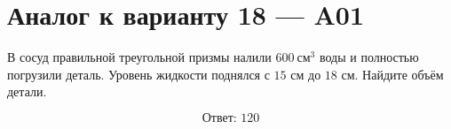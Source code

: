 \documentclass[12pt,a4paper]{article}
\begin{document}
\section*{Аналог к варианту 18 — A01}

В сосуд правильной треугольной призмы налили \(600\ \text{см}^3\) воды и полностью погрузили деталь. Уровень жидкости поднялся с \(15\) см до \(18\) см. Найдите объём детали.

\begin{center}
\end{center}

\[
\boxed{\text{Ответ: }120}
\]
\end{document}
